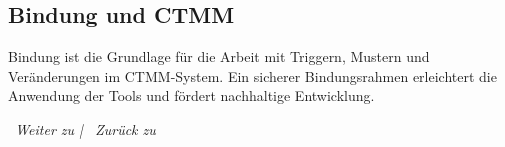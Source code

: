 \subsection*{\texorpdfstring{\textcolor{ctmmBlue}{Bindung und CTMM}}{Bindung und CTMM}}
Bindung ist die Grundlage für die Arbeit mit Triggern, Mustern und Veränderungen im CTMM-System. Ein sicherer Bindungsrahmen erleichtert die Anwendung der Tools und fördert nachhaltige Entwicklung.

\vspace{1cm}
\begin{center}
\textit{\textcolor{ctmmGreen}{\faChevronRight~Weiter zu}  | \textcolor{ctmmBlue}{\faChevronLeft~Zurück zu} }
\end{center}
